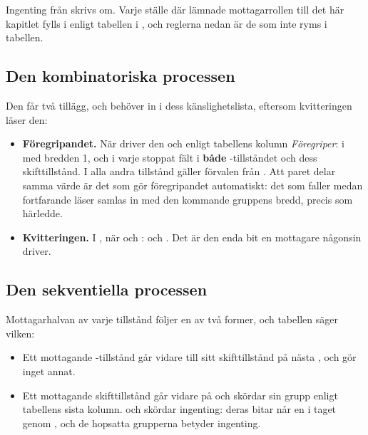 Ingenting från  skrivs om. Varje ställe där  lämnade mottagarrollen
till det här kapitlet fylls i enligt tabellen i , och reglerna nedan är de som
inte ryms i tabellen.

\subsection*{Den kombinatoriska processen}
Den får två tillägg, och  behöver in i dess känslighetslista, eftersom kvitteringen
läser den:
\begin{itemize}
  \item \textbf{Föregripandet.} När  driver den  och
     enligt tabellens kolumn \emph{Föregriper}: i  med bredden
    1, och i varje stoppat fält i \textbf{både} -tillståndet och dess
    skifttillstånd. I alla andra tillstånd gäller förvalen från . Att paret delar
    samma värde är det som gör föregripandet automatiskt: det  som faller medan
     fortfarande läser  samlas in med den kommande gruppens bredd,
    precis som  härledde.
  \item \textbf{Kvitteringen.} I , när  och
    :  och . Det är den enda bit en
    mottagare någonsin driver.
\end{itemize}

\subsection*{Den sekventiella processen}
Mottagarhalvan av varje tillstånd följer en av två former, och tabellen säger vilken:
\begin{itemize}
  \item Ett mottagande -tillstånd går vidare till sitt skifttillstånd på nästa
    , och gör inget annat.
  \item Ett mottagande skifttillstånd går vidare på  och skördar sin grupp enligt
    tabellens sista kolumn.  och  skördar ingenting: deras
    bitar når  en i taget genom , och de hopsatta grupperna betyder
    ingenting.
\end{itemize}

